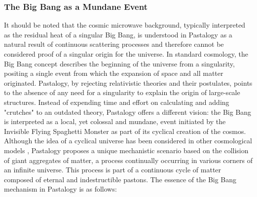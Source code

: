 \documentclass[pdflatex,sn-mathphys-num]{sn-jnl}
\begin{document}
\subsubsection{The Big Bang as a Mundane Event}\label{subsubsec:big-bang}

It should be noted that the cosmic microwave background, typically interpreted as the residual heat of a singular Big Bang, is understood in Pastalogy as a natural result of continuous scattering processes and therefore cannot be considered proof of a singular origin for the universe.
In standard cosmology, the Big Bang concept describes the beginning of the universe from a singularity, positing a single event from which the expansion of space and all matter originated. Pastalogy, by rejecting relativistic theories and their postulates, points to the absence of any need for a singularity to explain the origin of large-scale structures. Instead of expending time and effort on calculating and adding "crutches" to an outdated theory, Pastalogy offers a different vision: the Big Bang is interpreted as a local, yet colossal and mundane, event initiated by the Invisible Flying Spaghetti Monster as part of its cyclical creation of the cosmos. Although the idea of a cyclical universe has been considered in other cosmological models \cite{steinhardt2007-cyclic}, Pastalogy proposes a unique mechanistic scenario based on the collision of giant aggregates of matter, a process continually occurring in various corners of an infinite universe.
This process is part of a continuous cycle of matter composed of eternal and indestructible pastons. The essence of the Big Bang mechanism in Pastalogy is as follows:
\end{document}
